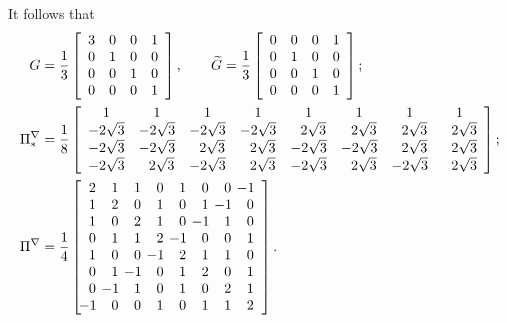\documentclass[a4paper]{article}
\begin{document}
\noindent
It follows that
\begin{align}
G = \frac{1}{3}&\left[\begin{array}{c c c c}
3 & 0 & 0 & 1\\
0 & 1 & 0 & 0\\
0 & 0 & 1 & 0\\
0 & 0 & 0 & 1
\end{array}\right],
\qquad 
\widetilde{G} = \frac{1}{3}\left[\begin{array}{c c c c}
0 & 0 & 0 & 1\\
0 & 1 & 0 & 0\\
0 & 0 & 1 & 0\\
0 & 0 & 0 & 1
\end{array}\right];\\
%
\Pi^\nabla_* =\frac{1}{8}&\left[\begin{array}{c c c c c c c c}
1 & 1 & 1 & 1 & 1 & 1 & 1 & 1\\
-2\sqrt{3} & -2\sqrt{3} & -2\sqrt{3} & -2\sqrt{3} & \ \ 2\sqrt{3} & \ \ 2\sqrt{3} & \ \ 2\sqrt{3} & \ \ 2\sqrt{3}\\
-2\sqrt{3} & -2\sqrt{3} & \ \ 2\sqrt{3} & \ \ 2\sqrt{3} & -2\sqrt{3} & -2\sqrt{3} & \ \ 2\sqrt{3} & \ \ 2\sqrt{3}\\
-2\sqrt{3} & \ \ 2\sqrt{3} & -2\sqrt{3} & \ \ 2\sqrt{3} & -2\sqrt{3} & \ \ 2\sqrt{3} & -2\sqrt{3} & \ \ 2\sqrt{3}\\
\end{array}\right];\\
%
\Pi^\nabla = \frac{1}{4}&\left[\begin{array}{c c c c c c c c}
2 & 1 & 1 & 0 & 1 & 0 & 0 & \!\!\!\! -1\\
1 & 2 & 0 & 1 & 0 & 1 & \!\!\!\! -1 & 0\\
1 & 0 & 2 & 1 & 0 & \!\!\!\! -1 & 1 & 0\\
0 & 1 & 1 & 2 & \!\!\!\! -1 & 0 & 0 & 1\\
1 & 0 & 0 & \!\!\!\! -1 & 2 & 1 & 1 & 0\\
0 & 1 & \!\!\!\! -1 & 0 & 1 & 2 & 0 & 1\\
0 & \!\!\!\! -1 & 1 & 0 & 1 & 0 & 2 & 1\\
\!\!\!\! -1 & 0 & 0 & 1 & 0 & 1 & 1 & 2
\end{array}\right].
\end{align}
\end{document}
